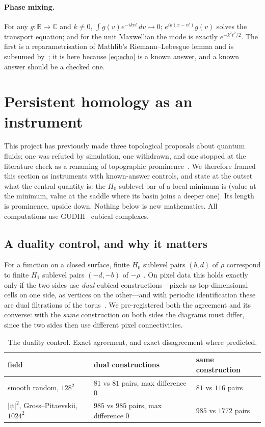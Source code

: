 \documentclass[11pt,a4paper]{article}
\begin{document}
\paragraph{Phase mixing.} For any $g:\mathbb R\to\mathbb C$ and $k\neq0$,
$\int g(v)e^{-ikvt}\,dv\to0$; $e^{ik(x-vt)}g(v)$ solves the transport equation; and for the unit
Maxwellian the mode is exactly $e^{-k^2t^2/2}$. The first is a reparametrisation of Mathlib's
Riemann--Lebesgue lemma and is subsumed by~\cite{Bedrossian2026}; it is here because
\eqref{eq:echo} is a known answer, and a known answer should be a checked one.

\section{Persistent homology as an instrument}
\label{sec:tda}

This project has previously made three topological proposals about quantum fluids; one was refuted by
simulation, one withdrawn, and one stopped at the literature check as a renaming of topographic
prominence~\cite{CallensLean}. We therefore framed this section as instruments with known-answer
controls, and state at the outset what the central quantity is: the $H_0$ sublevel bar of a local
minimum is (value at the minimum, value at the saddle where its basin joins a deeper one). Its length is
prominence, upside down. Nothing below is new mathematics. All computations use GUDHI~\cite{GUDHI}
cubical complexes.

\subsection{A duality control, and why it matters}

For a function on a closed surface, finite $H_0$ sublevel pairs $(b,d)$ of $\rho$ correspond to finite
$H_1$ sublevel pairs $(-d,-b)$ of $-\rho$~\cite{CSEH2009}. On pixel data this holds exactly only if the
two sides use \emph{dual} cubical constructions---pixels as top-dimensional cells on one side, as
vertices on the other---and with periodic identification these are dual filtrations of the
torus~\cite{Bleile2022}. We pre-registered both the agreement and its converse: with the \emph{same}
construction on both sides the diagrams must differ, since the two sides then use different pixel
connectivities.

\begin{table}[h]\centering\small
\begin{tabular}{@{}lll@{}}
\toprule
field & dual constructions & same construction \\
\midrule
smooth random, $128^2$ & $81$ vs $81$ pairs, max difference $0$ & $81$ vs $116$ pairs \\
$|\psi|^2$, Gross--Pitaevskii, $1024^2$ & $985$ vs $985$ pairs, max difference $0$ & $985$ vs $1772$ pairs \\
\bottomrule
\end{tabular}
\caption{The duality control. Exact agreement, and exact disagreement where predicted.}
\end{table}
\end{document}

